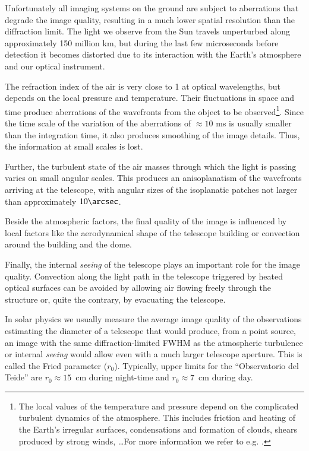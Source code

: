 Unfortunately all imaging systems on the ground are subject to aberrations that degrade the image quality, resulting in a much lower spatial resolution than the diffraction limit. The light we observe from the Sun travels unperturbed along approximately 150 million km, but during the last few microseconds before detection it becomes distorted due to its interaction with the Earth's atmosphere and our optical instrument.

The refraction index of the air is very close to 1 at optical wavelengths, but depends on the local pressure and temperature. Their fluctuations in space and time produce aberrations of the wavefronts from the object to be observed\footnote{The local values of the temperature and pressure depend on the complicated turbulent dynamics of the atmosphere. This includes friction and heating of the Earth's irregular surfaces, condensations and formation of clouds, shears produced by strong winds, \dots For more information we refer to e.g.  \citealt{2002RvMP...74..551S}.}. Since the time scale of the variation of the aberrations of $\approx 10$ ms is usually smaller than the integration time, it also produces smoothing of the image details. Thus, the information at small scales is lost.

Further, the turbulent state of the air masses through which the light is passing varies on small angular scales. This produces an anisoplanatism of the wavefronts arriving at the telescope, with angular sizes of the isoplanatic patches not larger than approximately $ 10\arcsec$.

Beside the atmospheric factors, the final quality of the image is influenced by local factors like the aerodynamical shape of the telescope building or convection around the building and the dome. 

Finally, the internal \emph{seeing} of the telescope plays an important role for the image quality. Convection along the light path in the telescope triggered by heated optical surfaces can be avoided by allowing air flowing freely through the structure or, quite the contrary, by evacuating the telescope.

In solar physics we usually measure the average image quality of the observations estimating the diameter of a telescope that would produce, from a point source, an image with the same diffraction-limited FWHM as the atmospheric turbulence or internal \emph{seeing} would allow even with a much larger telescope aperture. This is called the Fried parameter ($r_{0}$).  Typically, upper limits for the ``Observatorio del Teide'' are $r_{0} \approx 15$\, cm during night-time  and $r_{0} \approx 7$\, cm during day.

